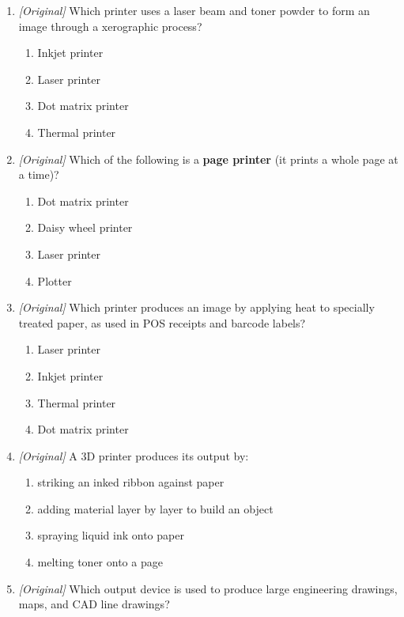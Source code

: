 \documentclass[11pt]{article}
\begin{document}
\begin{enumerate}[label=\textbf{Q\arabic*.}, leftmargin=*]
\begin{enumerate}[label=\Alph*.]
    \item Dot matrix printer
  \end{enumerate}
\item \textit{[Original]} Which printer uses a laser beam and toner powder to
  form an image through a xerographic process?
  \begin{enumerate}[label=\Alph*.]
    \item Inkjet printer
    \item Laser printer
    \item Dot matrix printer
    \item Thermal printer
  \end{enumerate}
\item \textit{[Original]} Which of the following is a \textbf{page printer}
  (it prints a whole page at a time)?
  \begin{enumerate}[label=\Alph*.]
    \item Dot matrix printer
    \item Daisy wheel printer
    \item Laser printer
    \item Plotter
  \end{enumerate}
\item \textit{[Original]} Which printer produces an image by applying heat to
  specially treated paper, as used in POS receipts and barcode labels?
  \begin{enumerate}[label=\Alph*.]
    \item Laser printer
    \item Inkjet printer
    \item Thermal printer
    \item Dot matrix printer
  \end{enumerate}
\item \textit{[Original]} A 3D printer produces its output by:
  \begin{enumerate}[label=\Alph*.]
    \item striking an inked ribbon against paper
    \item adding material layer by layer to build an object
    \item spraying liquid ink onto paper
    \item melting toner onto a page
  \end{enumerate}
\item \textit{[Original]} Which output device is used to produce large
  engineering drawings, maps, and CAD line drawings?
  \begin{enumerate}[label=\Alph*.]

\end{enumerate}
\end{enumerate}
\end{document}
